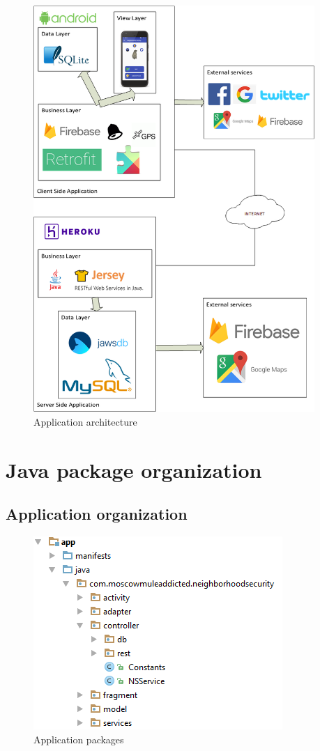 \documentclass[a4paper]{scrreprt}
\begin{document}
\begin{figure}[H]
	\centering
	\includegraphics[width=0.95\textwidth]{imgs/structure}
	\caption{Application architecture}
\end{figure}


\section{Java package organization}
\subsection{Application organization}
\begin{figure}[H]
	\centering
	\includegraphics{imgs/packages}
	\caption{Application packages}
\end{figure}
\end{document}

